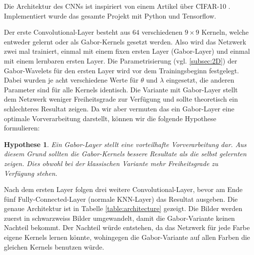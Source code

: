 Die Architektur des CNNs ist inspiriert von einem Artikel über CIFAR-10 \cite{online:cifar10}.
Implementiert wurde das gesamte Projekt mit Python und Tensorflow.

Der erste Convolutional-Layer besteht aus $64$ verschiedenen $9 \times 9$ Kerneln, welche entweder gelernt oder als Gabor-Kernels gesetzt werden.
Also wird das Netzwerk zwei mal trainiert, einmal mit einem fixen ersten Layer (Gabor-Layer) und einmal mit einem lernbaren ersten Layer.
Die Parametrisierung (vgl. \ref{subsec:2D}) der Gabor-Wavelets für den ersten Layer wird vor dem Trainingsbeginn festgelegt.
Dabei wurden je acht verschiedene Werte für $\theta$ und $\lambda$ eingesetzt, die anderen Parameter sind für alle Kernels identisch.
Die Variante mit Gabor-Layer stellt dem Netzwerk weniger Freiheitsgrade zur Verfügung und sollte theoretisch ein schlechteres Resultat zeigen.
Da wir aber vermuten das ein Gabor-Layer eine optimale Vorverarbeitung darstellt, können wir die folgende Hypothese formulieren:
\newtheorem{hypothese}{Hypothese}
\begin{hypothese}\label{hyp:1}
	 Ein Gabor-Layer stellt eine vorteilhafte Vorverarbeitung dar.
	 Aus diesem Grund sollten die Gabor-Kernels bessere Resultate als die selbst gelernten zeigen.
	 Dies obwohl bei der klassischen Variante mehr Freiheitsgrade zu Verfügung stehen.
\end{hypothese}

Nach dem ersten Layer folgen drei weitere Convolutional-Layer, bevor am Ende fünf Fully-Connected-Layer (normale KNN-Layer) das Resultat ausgeben.
Die genaue Architektur ist in Tabelle \ref{table:architecture} gezeigt.
Die Bilder werden zuerst in schwarzweiss Bilder umgewandelt, damit die Gabor-Variante keinen Nachteil bekommt.
Der Nachteil würde entstehen, da das Netzwerk für jede Farbe eigene Kernels lernen könnte, wohingegen die Gabor-Variante auf allen Farben die gleichen Kernels benutzen würde. 


